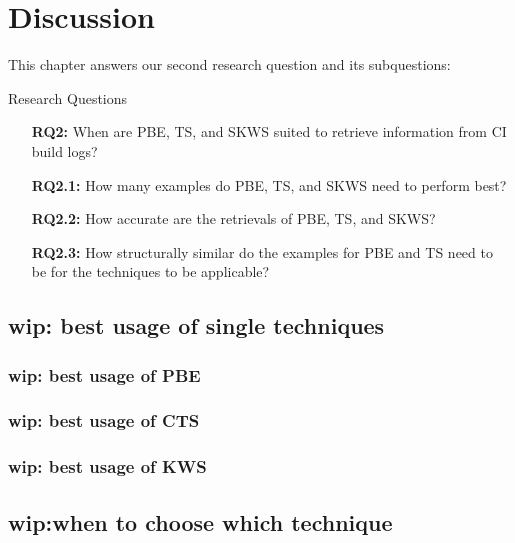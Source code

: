 \documentclass[\myrootdir/main.tex]{subfiles}
\begin{document}
\chapter{Discussion}

This chapter answers our second research question and its subquestions:
\begin{simplebox}{Research Questions}
\begin{itemize}
  \item[\textbf{RQ2:}] When are PBE, TS, and SKWS suited to retrieve information from CI build logs?
  \item[\textbf{RQ2.1:}] How many examples do PBE, TS, and SKWS need to perform best?
  \item[\textbf{RQ2.2:}] How accurate are the retrievals of PBE, TS, and SKWS?
  \item[\textbf{RQ2.3:}] How structurally similar do the examples for PBE and TS need to be for the techniques to be applicable?
\end{itemize}
\end{simplebox}

\section{wip: best usage of single techniques}
\subsection{wip: best usage of PBE}
\subsection{wip: best usage of CTS}
\subsection{wip: best usage of KWS}

\section{wip:when to choose which technique}
\end{document}
